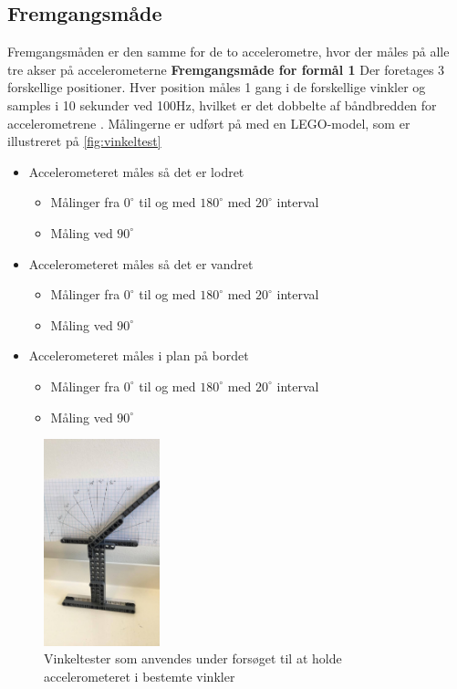 \subsection{Fremgangsmåde} 
Fremgangsmåden er den samme for de to accelerometre, hvor der måles på alle tre akser på accelerometerne 
\textbf{Fremgangsmåde for formål 1} \label{vinkel_fremgangsmaade}
Der foretages 3 forskellige positioner. Hver position måles 1 gang i de forskellige vinkler og samples i 10 sekunder ved 100Hz, hvilket er det dobbelte af båndbredden for accelerometrene \citep{analogdevices2010}. Målingerne er udført på med en LEGO-model, som er illustreret på \autoref{fig:vinkeltest}
\begin{itemize}
\item Accelerometeret måles så det er lodret
\begin{itemize}
\item Målinger fra $0^{\circ}$ til og med $180^{\circ}$ med $20^{\circ}$ interval 
\item Måling ved $90^{\circ}$  
\end{itemize}
\item Accelerometeret måles så det er vandret
\begin{itemize}
\item Målinger fra $0^{\circ}$ til og med $180^{\circ}$ med $20^{\circ}$ interval 
\item Måling ved $90^{\circ}$  
\end{itemize}
\item Accelerometeret måles i plan på bordet
\begin{itemize}
\item Målinger fra $0^{\circ}$ til og med $180^{\circ}$ med $20^{\circ}$ interval 
\item Måling ved $90^{\circ}$  
\end{itemize}
\end{itemize}


\begin{figure}[H]
\centering
\includegraphics[width=0.3\textwidth]{figures/vinkeltest}
\caption{Vinkeltester som anvendes under forsøget til at holde accelerometeret i bestemte vinkler}
\label{fig:vinkeltest}
\end{figure}

